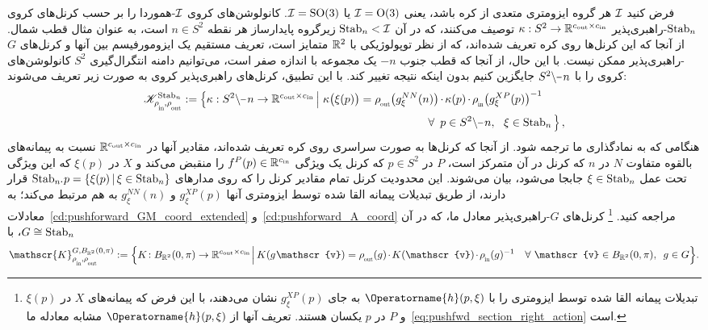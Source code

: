 فرض کنید $\mathcal{I}$ هر گروه ایزومتری متعدی از کره باشد، یعنی $\mathcal{I}=\operatorname{O}(3)$ یا $\mathcal{I}=\operatorname{SO}(3)$.
\citet{Cohen2019-generaltheory} کانولوشن‌های کروی $\mathcal{I}$-هموردا را بر حسب کرنل‌های کروی $\operatorname{Stab}_{n}$-راهبری‌پذیر ${\kappa: S^2 \to \mathbb{R}^{{c_\textup{out}}\times{c_\textup{in}}}}$ توصیف می‌کنند، که در آن $\operatorname{Stab}_{n} < \mathcal{I}$ زیرگروه پایدارساز هر نقطه $n\in S^2$ است، به عنوان مثال قطب شمال.
از آنجا که این کرنل‌ها روی کره تعریف شده‌اند، که از نظر توپولوژیکی با $\mathbb{R}^2$ متمایز است، تعریف مستقیم یک ایزومورفیسم بین آنها و کرنل‌های $G$-راهبری‌پذیر ممکن نیست.
با این حال، از آنجا که قطب جنوب $-n$ یک مجموعه با اندازه صفر است، می‌توانیم دامنه انتگرال‌گیری $S^2$ کانولوشن‌های کروی را با $S^2\backslash \mkern-1mu\minus\mkern1mu n$ جایگزین کنیم بدون اینکه نتیجه تغییر کند.
با این تطبیق، کرنل‌های راهبری‌پذیر کروی \citet{Cohen2019-generaltheory} به صورت زیر تعریف می‌شوند:
\begin{align}\label{eq:spherical_steerable_kernel_space}
	\mathscr{K}^{\Stab{n}}_{\rhoin\mkern-1mu,\rhoout}
	:= \pig\{ \kappa: S^2\backslash \mkern-1mu\minus\mkern1mu n \to \R^{\cout\times\cin}
	\,\pig|\ \kappa\big(\xi (p)\big) = \rhoout\big( g_\xi^{NN}(n) \big) \mkern-1.5mu\cdot\mkern-1.5mu \kappa(p) \mkern-1.5mu\cdot\mkern-1.5mu \rhoin\big( g_\xi^{XP}(p) \big)^{-1}
	\qquad \\ \notag
	\forall\,\ p\in S^2\backslash \mkern-1mu\minus\mkern1mu n,\ \ \xi\in\Stab{n} \pig\} \,,
\end{align}
هنگامی که به نمادگذاری ما ترجمه شود.
از آنجا که کرنل‌ها به صورت سراسری روی کره تعریف شده‌اند، مقادیر آنها در $\mathbb{R}^{{c_\textup{out}}\times{c_\textup{in}}}$ نسبت به پیمانه‌های بالقوه متفاوت $N$ در $n$ که کرنل در آن متمرکز است، $P$ در $p\in S^2$ که کرنل یک ویژگی $f^P(p) \in \mathbb{R}^{c_\textup{in}}$ را منقبض می‌کند و $X$ در $\xi(p)$ که این ویژگی تحت عمل $\xi \in \operatorname{Stab}_{n}$ جابجا می‌شود، بیان می‌شوند.
این محدودیت کرنل تمام مقادیر کرنل را که روی مدارهای ${\operatorname{Stab}_{n}\mkern-4mu.\mkern1mup} = \{ \xi(p) \,|\, \xi\in\operatorname{Stab}_{n} \}$ قرار دارند، از طریق تبدیلات پیمانه القا شده توسط ایزومتری آنها $g_\xi^{XP}(p)$ و $g_\xi^{NN}(n)$ به هم مرتبط می‌کند؛ به معادلات~\eqref{cd:pushforward_GM_coord_extended} و~\eqref{cd:pushforward_A_coord} مراجعه کنید.%
\footnote{
	\citet{Cohen2019-generaltheory} تبدیلات پیمانه القا شده توسط ایزومتری را با $\Operatorname{h}(p,\xi)$ به جای $g_\xi^{XP}(p)$ نشان می‌دهند، با این فرض که پیمانه‌های $X$ در $\xi(p)$ و $P$ در $p$ یکسان هستند.
	تعریف آنها از $\Operatorname{h}(p,\xi)$ مشابه معادله ما~\eqref{eq:pushfwd_section_right_action} است.
}
کرنل‌های $G$-راهبری‌پذیر معادل ما، که در آن $G \cong \operatorname{Stab}_{n}$، با
\begin{align}\label{eq:G_steer_kernel_space_open_ball_pi}
	\mathscr{K}^{G,B_{\R^2}(0,\pi)}_{\rhoin\mkern-1mu,\rhoout}
	:= \Big\{ K\!: B_{\R^2}(0,\pi) \to \R^{\cout\times\cin} \mkern1.5mu\Big|\,
	K(g\mkern1mu \mathscr{v}) =
	\rhoout(g) \mkern-2mu\cdot\mkern-2mu K(\mathscr{v}) \mkern-2mu\cdot\mkern-2mu \rhoin(g)^{-1} \ \ \ \forall\ \mathscr{v}\in B_{\R^2}(0,\pi),\,\ g\in G \Big\} .
\end{align}
